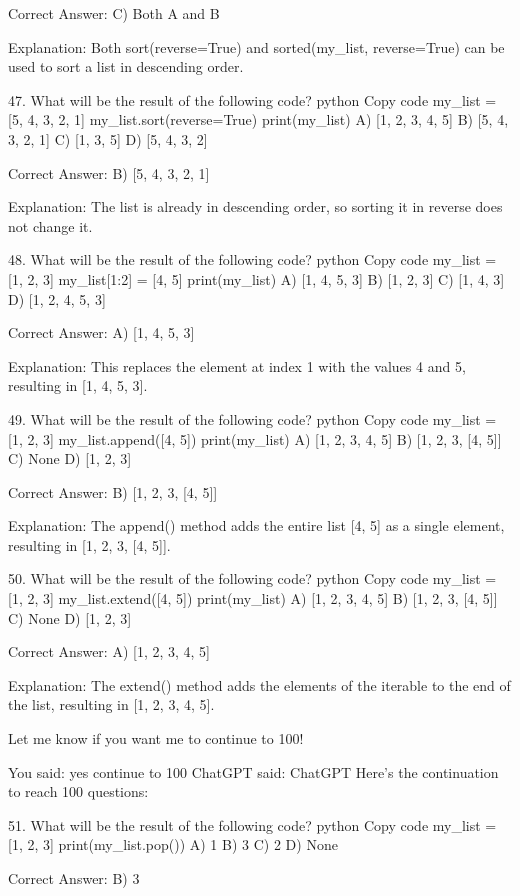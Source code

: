 Correct Answer: C) Both A and B

Explanation:
Both sort(reverse=True) and sorted(my_list, reverse=True) can be used to sort a list in descending order.

47. What will be the result of the following code?
python
Copy code
my_list = [5, 4, 3, 2, 1]
my_list.sort(reverse=True)
print(my_list)
A) [1, 2, 3, 4, 5]
B) [5, 4, 3, 2, 1]
C) [1, 3, 5]
D) [5, 4, 3, 2]

Correct Answer: B) [5, 4, 3, 2, 1]

Explanation:
The list is already in descending order, so sorting it in reverse does not change it.

48. What will be the result of the following code?
python
Copy code
my_list = [1, 2, 3]
my_list[1:2] = [4, 5]
print(my_list)
A) [1, 4, 5, 3]
B) [1, 2, 3]
C) [1, 4, 3]
D) [1, 2, 4, 5, 3]

Correct Answer: A) [1, 4, 5, 3]

Explanation:
This replaces the element at index 1 with the values 4 and 5, resulting in [1, 4, 5, 3].

49. What will be the result of the following code?
python
Copy code
my_list = [1, 2, 3]
my_list.append([4, 5])
print(my_list)
A) [1, 2, 3, 4, 5]
B) [1, 2, 3, [4, 5]]
C) None
D) [1, 2, 3]

Correct Answer: B) [1, 2, 3, [4, 5]]

Explanation:
The append() method adds the entire list [4, 5] as a single element, resulting in [1, 2, 3, [4, 5]].

50. What will be the result of the following code?
python
Copy code
my_list = [1, 2, 3]
my_list.extend([4, 5])
print(my_list)
A) [1, 2, 3, 4, 5]
B) [1, 2, 3, [4, 5]]
C) None
D) [1, 2, 3]

Correct Answer: A) [1, 2, 3, 4, 5]

Explanation:
The extend() method adds the elements of the iterable to the end of the list, resulting in [1, 2, 3, 4, 5].

Let me know if you want me to continue to 100!






You said:
yes continue to 100
ChatGPT said:
ChatGPT
Here’s the continuation to reach 100 questions:

51. What will be the result of the following code?
python
Copy code
my_list = [1, 2, 3]
print(my_list.pop())
A) 1
B) 3
C) 2
D) None

Correct Answer: B) 3

